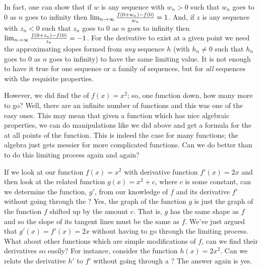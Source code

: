 In fact, one can show that if $w$ is any sequence with $w_n > 0$ such that $w_n$ goes to $0$ as $n$ goes to infinity then
$\lim_{n\rightarrow \infty} {f(0+w_n) - f(0) \over w_n} = 1$. And, if $z$ is any sequence with $z_n < 0$ such that $z_n$ goes
to $0$ as $n$ goes to infinity then
$\lim_{n\rightarrow \infty} {f(0+z_n) - f(0) \over z_n} = -1$.
For the derivative to exist at a given point we need the approximating slopes formed from {\it any\/} sequence $h$
 (with $h_n \ne 0$ such that $h_n$ goes to $0$ as $n$  goes to infinity) to have the same limiting value. 
It is not enough to have it true for one sequence or a family of sequences,
but for  {\it all\/} sequences with the requisite properties.

However, we did find the  of $f(x) = x^2$; so,
one function down, how many more to go? Well, there are an infinite 
number of functions and this was one of the easy ones. This may mean that 
given a function which has nice algebraic properties, we can do manipulations 
like we did above and get a formula for the  at all points of 
the function. This is indeed the case for many functions; the algebra just gets messier for more 
complicated functions. Can we do better than to do this limiting process 
again and again?

If we look at our function $f(x) = x^2$ with derivative function $f'(x) = 2x$
and then look at the related function $g(x) = x^2 + c$, where $c$ is some 
constant, 
can we determine the  function, $g'$, from our knowledge of 
$f$ and its derivative $f'$ without going through the ? 
Yes, the graph of the function $g$ is just 
the graph of the function $f$ shifted up by the amount $c$. That is, $g$ has 
the same shape as $f$ and so the slope of its tangent lines must be the same 
as $f$. We've just argued that $g'(x) = f'(x) = 2x$ without having to go 
through the limiting process. 
What about other functions which are simple modifications of $f$, can we 
find their derivatives so easily? For instance, consider the function 
$h(x) = 2x^2$. Can we relate the derivative $h'$ to $f'$ without 
going through a ? The answer again is yes.

